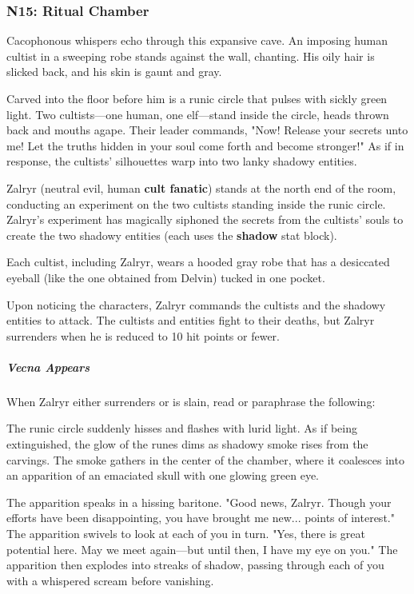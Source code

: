 \documentclass[10pt,a4paper,twoside,fancy,bg=print,twocolumn,openany,nodeprecatedcode]{dndbook}
\begin{document}
\subsubsection{N15: Ritual Chamber}
\begin{DndReadAloud}{}
Cacophonous whispers echo through this expansive cave. An imposing human cultist in a sweeping robe stands against the wall, chanting. His oily hair is slicked back, and his skin is gaunt and gray.

Carved into the floor before him is a runic circle that pulses with sickly green light. Two cultists—one human, one elf—stand inside the circle, heads thrown back and mouths agape. Their leader commands, "Now! Release your secrets unto me! Let the truths hidden in your soul come forth and become stronger!" As if in response, the cultists' silhouettes warp into two lanky shadowy entities.

\end{DndReadAloud}

Zalryr (neutral evil, human \textbf{cult fanatic}) stands at the north end of the room, conducting an experiment on the two cultists standing inside the runic circle. Zalryr's experiment has magically siphoned the secrets from the cultists' souls to create the two shadowy entities (each uses the \textbf{shadow} stat block).

Each cultist, including Zalryr, wears a hooded gray robe that has a desiccated eyeball (like the one obtained from Delvin) tucked in one pocket.

Upon noticing the characters, Zalryr commands the cultists and the shadowy entities to attack. The cultists and entities fight to their deaths, but Zalryr surrenders when he is reduced to 10 hit points or fewer.

\subparagraph{Vecna Appears}
When Zalryr either surrenders or is slain, read or paraphrase the following:

\begin{DndReadAloud}{}
The runic circle suddenly hisses and flashes with lurid light. As if being extinguished, the glow of the runes dims as shadowy smoke rises from the carvings. The smoke gathers in the center of the chamber, where it coalesces into an apparition of an emaciated skull with one glowing green eye.

The apparition speaks in a hissing baritone. "Good news, Zalryr. Though your efforts have been disappointing, you have brought me new... points of interest." The apparition swivels to look at each of you in turn. "Yes, there is great potential here. May we meet again—but until then, I have my eye on you." The apparition then explodes into streaks of shadow, passing through each of you with a whispered scream before vanishing.

\end{DndReadAloud}
\end{document}
